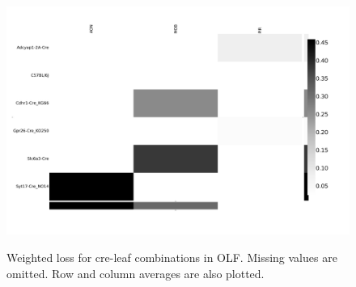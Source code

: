 \begin{figure}[H]
    \centering
    \includegraphics[width = 7in]{figs/lossdetails_698.png} 
    \label{fig:distances}
    \caption{Weighted loss for cre-leaf combinations in OLF.  Missing values are omitted.   Row and column averages are also plotted.}
\end{figure}

